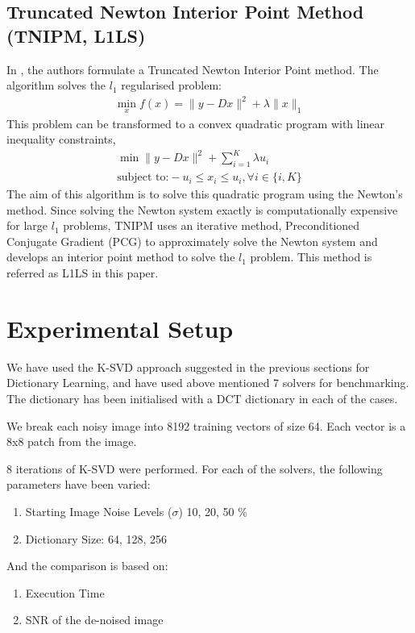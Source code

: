 \documentclass{article} %
\begin{document}
\subsection{Truncated Newton Interior Point Method (TNIPM, L1LS)}
In \cite{l1lskim2007efficient}, the authors formulate a Truncated Newton Interior Point method. The algorithm solves the $l_1$ regularised problem:
\begin{align}
\min_x f(x) = \|y - Dx\|^2 + \lambda\|x\|_1
\end{align}
This problem can be transformed to a convex quadratic program with linear inequality constraints,
\begin{align}
\min \|y - Dx\|^2 + \sum_{i= 1}^{K}\lambda u_i	\\
\text{subject to:} -u_i \leq x_i \leq u_i, \forall i \in \{i,K\}
\end{align}
The aim of this algorithm is to solve this quadratic program using the Newton's method. Since solving the Newton system exactly is computationally expensive for large $l_1$ problems, TNIPM uses an iterative method, Preconditioned Conjugate Gradient (PCG) to approximately solve the Newton system and develops an interior point method to solve the $l_1$ problem. This method is referred as L1LS in this paper.


\section{Experimental Setup}

We have used the K-SVD approach suggested in the previous sections for Dictionary Learning, and have used above mentioned 7 solvers for benchmarking.
The dictionary has been initialised with a DCT dictionary in each of the cases.

We break each noisy image into 8192 training vectors of size 64. Each vector is a $8$x$8$ patch from the image.  

8 iterations of K-SVD were performed.
For each of the solvers, the following parameters have been varied:
\begin{enumerate}
\item Starting Image Noise Levels ($\sigma$) 10, 20, 50 \%
\item Dictionary Size: 64, 128, 256
\end{enumerate}

And the comparison is based on:
\begin{enumerate}
\item Execution Time
\item SNR of the de-noised image
\end{enumerate}
\end{document}
